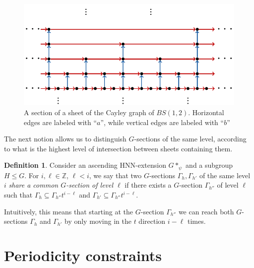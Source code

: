 \documentclass[letterpaper,11pt,reqno]{amsart}
\theoremstyle{plain}
\theoremstyle{definition}
\newtheorem{definition}{Definition}[section]
\theoremstyle{cupremark}
\begin{document}
\begin{figure}[h]
	\centering
	\includegraphics[scale=0.9]{bs_onesheet.pdf}
	\caption{A section of a sheet of the Cayley graph of $BS(1,2)$.  Horizontal edges are labeled with ``$a$'', while vertical edges are labeled with ``$b$''}
	\label{fig:bssheet}
\end{figure}

The next notion allows us to distinguish $G$-sections of the same level, according to what is the highest level of intersection between sheets containing them.

\begin{definition} Consider an ascending HNN-extension $G*_{\psi}$ and a subgroup $H\leqslant G$. For $i,\ell\in \mathbb{Z}$, $\ell < i$, we say that two $G$-sections $\Gamma_h, \Gamma_{h'}$ of the same level $i$ \textit{share a common $G$-section of level $\ell$} if there exists a $G$-section $\Gamma_{h''}$ of level $\ell$ such that $\Gamma_{h}\subseteq \Gamma_{h''}t^{i-\ell}$ and $\Gamma_{h'}\subseteq \Gamma_{h''}t^{i-\ell}$.
	
	Intuitively, this means that starting at the $G$-section $\Gamma_{h''}$ we can reach both $G$-sections $\Gamma_{h}$ and $\Gamma_{h'}$ by only moving in the $t$ direction $i-\ell$ times.
\end{definition}



\section{Periodicity constraints}\label{section:weak_periodicity}
\end{document}
